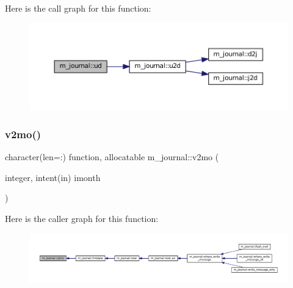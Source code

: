Here is the call graph for this function\+:\nopagebreak
\begin{figure}[H]
\begin{center}
\leavevmode
\includegraphics[width=350pt]{namespacem__journal_abfa78dcc463f8fcdffe0b259df2f4c92_cgraph}
\end{center}
\end{figure}
\mbox{\label{namespacem__journal_a1941b83a2253bc58165639f256827534}} 
\subsubsection{\texorpdfstring{v2mo()}{v2mo()}}
{\footnotesize\ttfamily character(len=\+:) function, allocatable m\+\_\+journal\+::v2mo (\begin{DoxyParamCaption}\item[{integer, intent(in)}]{imonth }\end{DoxyParamCaption})\hspace{0.3cm}{\ttfamily [private]}}

Here is the caller graph for this function\+:\nopagebreak
\begin{figure}[H]
\begin{center}
\leavevmode
\includegraphics[width=350pt]{namespacem__journal_a1941b83a2253bc58165639f256827534_icgraph}
\end{center}
\end{figure}
\mbox{\label{namespacem__journal_a21238c3fc7731703c75eb39233ab529e}} 
